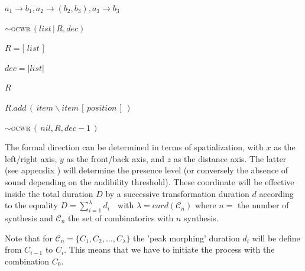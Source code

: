$a_1 \rightarrow b_1, a_2 \rightarrow (b_2, b_3), a_3 \rightarrow b_3$

\smallskip

\begin{algorithm}
\caption{$\sim$\textsc{ocwr}$\,(list\,|\,R, dec)$}\label{ocwr}
\begin{algorithmic}%



$R=$[ $list$ ]

$dec=| list |$
\EndIf


\Return $R$
\Else




$R.add\,(\,item \backslash item\,[\,position\,]\,)$

\EndFor
\EndIf
\EndFor

$\sim$\textsc{ocwr}$\,(\,nil, R,  dec-1\,)$

\EndIf

\end{algorithmic}
\end{algorithm}

\bigskip

The formal direction can be determined in terms of spatialization, with $x$ as the left/right axis, $y$ as the front/back axis, and $z$ as the distance axis. The latter (see appendix ) will determine the presence level (or conversely the absence of sound depending on the audibility threshold).
These coordinate will be effective inside the total duration $D$ by a successive transformation duration $d$ according to the equality $D=\displaystyle \sum\limits_{i=1}^{\lambda}d_i$
$\;$ with $\lambda = card(\mathcal{C}_n)$ where $n=$ the number of synthesis and $\mathcal{C}_n$ the set of combinatorics with $n$ synthesis. 

Note that for  $\mathcal{C}_n=\{ C_1, C_2, \dots, C_{\lambda} \}$ the 'peak morphing' duration $d_i$ will be define from $C_{i-1}$ to $C_{i}$. This means that we have to initiate the process with the combination $C_0$.

